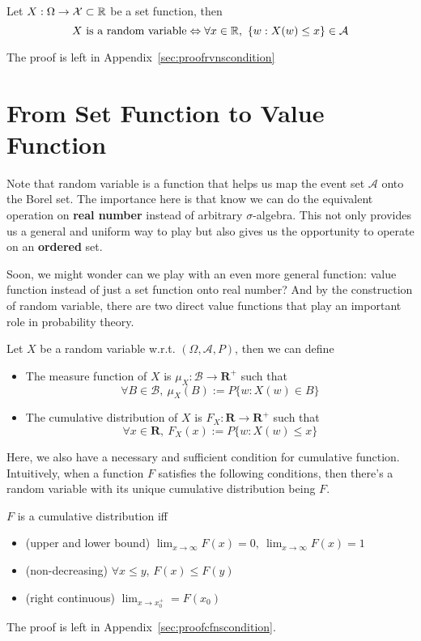 \documentclass[11pt]{article}
\begin{document}
\begin{theorem}\label{rvnscondition}
	Let $X:\Omega\rightarrow\mathcal{X}\subset{\mathbb R}$ be a set function, then
	$$X\mbox{ is a random variable}\Leftrightarrow \forall x\in{\mathbb R},\ \{w:X(w)\leq x\}\in\mathcal{A}$$
\end{theorem}
The proof is left in Appendix~\ref{sec:proofrvnscondition}

\section{From Set Function to Value Function}
Note that random variable is a function that helps us map the event set $\mathcal{A}$ onto the Borel set. The importance here is that know we can do the equivalent operation on {\bf real number} instead of arbitrary $\sigma$-algebra. This not only provides us a general and uniform way to play but also gives us the opportunity to operate on an {\bf ordered} set.

Soon, we might wonder can we play with an even more general function: value function instead of just a set function onto real number? And by the construction of random variable, there are two direct value functions that play an important role in probability theory.
\begin{theorem}
	Let $X$ be a random variable w.r.t. $(\Omega,\mathcal{A},P)$, then we can define
	\begin{itemize}
		\item The measure function of $X$ is $\mu_X:\mathcal{B}\rightarrow\mathbf{R}^+$ such that $$\forall B\in\mathcal{B},\ \mu_X(B):=P\{w:X(w)\in B\}$$
		\item The cumulative distribution of $X$ is $F_X:\mathbf{R}\rightarrow\mathbf{R}^+$ such that $$\forall x\in\mathbf{R},\ F_X(x):=P\{w:X(w)\leq x \}$$
	\end{itemize}
\end{theorem}

Here, we also have a necessary and sufficient condition for cumulative function. Intuitively, when a function $F$ satisfies the following conditions, then there's a random variable with its unique cumulative distribution being $F$.

\begin{theorem}
	$F$ is a cumulative distribution iff
	\begin{itemize}
		\item (upper and lower bound) $\lim_{x\rightarrow\infty}F(x)=0,\ \lim_{x\rightarrow\infty}F(x) = 1$
		\item (non-decreasing) $\forall x\leq y$, $F(x)\leq F(y)$
		\item (right continuous) $\lim_{x\rightarrow x_0^+} = F(x_0)$
	\end{itemize}
\end{theorem}
The proof is left in Appendix~\ref{sec:proofcfnscondition}.
\end{document}
